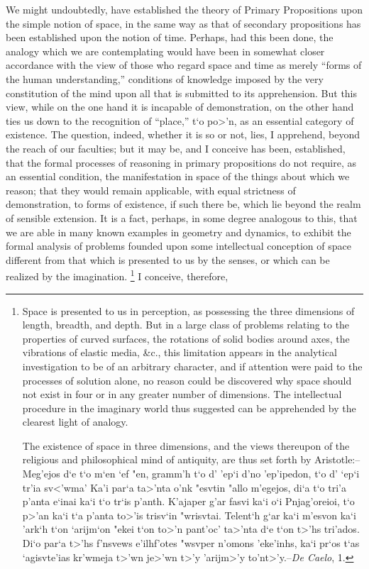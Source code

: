 \documentclass[oneside]{book}
\begin{document}
We might undoubtedly, have established the theory of Primary
Propositions upon the simple notion of space, in the same
way as that of secondary propositions has been established upon
the notion of time. Perhaps, had this been done, the analogy
which we are contemplating would have been in somewhat closer
accordance with the view of those who regard space and time
as merely ``forms of the human understanding,'' conditions of
knowledge imposed by the very constitution of the mind upon
all that is submitted to its apprehension. But this view, while
on the one hand it is incapable of demonstration, on the other
hand ties us down to the recognition of ``place,'' \textgreek{t`o po>'n}, as an
essential category of existence. The question, indeed, whether
it is so or not, lies, I apprehend, beyond the reach of our faculties;
but it may be, and I conceive has been, established, that the
formal processes of reasoning in primary propositions do not require,
as an essential condition, the manifestation in space of the
things about which we reason; that they would remain applicable,
with equal strictness of demonstration, to forms of existence,
if such there be, which lie beyond the realm of sensible
extension. It is a fact, perhaps, in some degree analogous to this,
that we are able in many known examples in geometry and dynamics,
to exhibit the formal analysis of problems founded upon
some intellectual conception of space different from that which is
presented to us by the senses, or which can be realized by the
imagination. \footnote {Space is presented to us in perception, as possessing the three dimensions
of length, breadth, and depth. But in a large class of problems relating to the
properties of curved surfaces, the rotations of solid bodies around axes, the vibrations
of elastic media, \&c., this limitation appears in the analytical investigation
to be of an arbitrary character, and if attention were paid to the processes
of solution alone, no reason could be discovered why space should not exist in
four or in any greater number of dimensions. The intellectual procedure in
the imaginary world thus suggested can be apprehended by the clearest light of
analogy.

The existence of space in three dimensions, and the views thereupon of the
religious and philosophical mind of antiquity, are thus set forth by Aristotle:--
\textgreek{Meg'ejos d`e t`o m`en `ef "en, gramm'h t`o d' 'ep`i d'no 'ep'ipedon, t`o d'
`ep`i tr'ia sv<'wma' Ka'i par`a ta>'nta o'nk "esvtin "allo m'egejos, di`a t`o tri'a p'anta
e`inai ka`i t`o tr`is p'anth. K'ajaper g'ar fasvi ka`i o`i Pnjag'oreioi, t`o p>'an ka`i t`a
p'anta to>'is trisv`in "wrisvtai. Telent`h g`ar ka`i m'esvon ka`i 'ark`h t`on  `arijm`on
"ekei t`on to>'n pant'oc' ta>'nta d`e t`on t>'hs tri'ados. Di`o par`a t>'hs f'nsvews
e'ilhf'otes "wsvper n'omons 'eke'inhs, ka`i pr`os t`as `agisvte'ias kr'wmeja t>'wn
je>'wn t>'y 'arijm>'y to'nt>'y.}--\textit{De Caelo}, 1.} I conceive, therefore,
\end{document}
